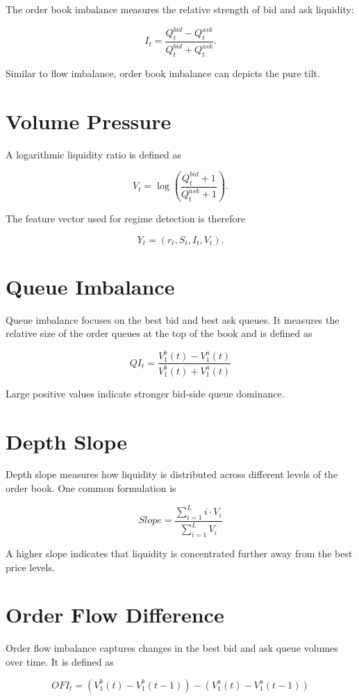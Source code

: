 \documentclass[12pt,a4paper]{report}
\begin{document}
The order book imbalance measures the relative strength of bid and ask liquidity:

\[
I_t =
\frac{Q_t^{bid} - Q_t^{ask}}
     {Q_t^{bid} + Q_t^{ask}}.
\]

Similar to flow imbalance, order book imbalance can depicts the pure tilt. 

\section{Volume Pressure}

A logarithmic liquidity ratio is defined as

\[
V_t =
\log\left(
\frac{Q_t^{bid}+1}{Q_t^{ask}+1}
\right).
\]

The feature vector used for regime detection is therefore

\[
Y_t = (r_t, S_t, I_t, V_t).
\]

\section{Queue Imbalance}

Queue imbalance focuses on the best bid and best ask queues. It measures the relative size of the order queues at the top of the book and is defined as

\[
QI_t =
\frac{V_1^b(t) - V_1^a(t)}
{V_1^b(t) + V_1^a(t)}
\]

Large positive values indicate stronger bid-side queue dominance.

\section{Depth Slope}

Depth slope measures how liquidity is distributed across different levels of the order book. One common formulation is

\[
Slope =
\frac{\sum_{i=1}^{L} i \cdot V_i}
{\sum_{i=1}^{L} V_i}
\]

A higher slope indicates that liquidity is concentrated further away from the best price levels.

\section{Order Flow Difference}

Order flow imbalance captures changes in the best bid and ask queue volumes over time. It is defined as

\[
OFI_t =
\left(V_1^b(t) - V_1^b(t-1)\right) -
\left(V_1^a(t) - V_1^a(t-1)\right)
\]
\end{document}
